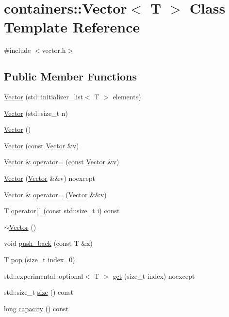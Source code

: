\hypertarget{classcontainers_1_1_vector}{}\section{containers\+:\+:Vector$<$ T $>$ Class Template Reference}
\label{classcontainers_1_1_vector}


{\ttfamily \#include $<$vector.\+h$>$}

\subsection*{Public Member Functions}
\begin{DoxyCompactItemize}
\item 
\hyperlink{classcontainers_1_1_vector_aa52463e44a833734438f930bd042950d}{Vector} (std\+::initializer\+\_\+list$<$ T $>$ elements)
\item 
\hyperlink{classcontainers_1_1_vector_a7100579cb97bfd12a22563ecba4790c3}{Vector} (std\+::size\+\_\+t n)
\item 
\hyperlink{classcontainers_1_1_vector_aeb1cf60022c7fc50ae6b17b2cba845ea}{Vector} ()
\item 
\hyperlink{classcontainers_1_1_vector_a53ca201d23d5093f1f0a5680bf878a61}{Vector} (const \hyperlink{classcontainers_1_1_vector}{Vector} \&v)
\item 
\hyperlink{classcontainers_1_1_vector}{Vector} \& \hyperlink{classcontainers_1_1_vector_a631c15e8044b459fdf35a9f0acd0d5b0}{operator=} (const \hyperlink{classcontainers_1_1_vector}{Vector} \&v)
\item 
\hyperlink{classcontainers_1_1_vector_a2c7dfd50610c1fc054516f18ec8a9452}{Vector} (\hyperlink{classcontainers_1_1_vector}{Vector} \&\&v) noexcept
\item 
\hyperlink{classcontainers_1_1_vector}{Vector} \& \hyperlink{classcontainers_1_1_vector_aade29fc98f40e726bc1c624d0157e397}{operator=} (\hyperlink{classcontainers_1_1_vector}{Vector} \&\&v)
\item 
T \hyperlink{classcontainers_1_1_vector_a8dcbd38c932f114a8237785f8272712f}{operator\mbox{[}$\,$\mbox{]}} (const std\+::size\+\_\+t i) const
\item 
\hyperlink{classcontainers_1_1_vector_aa34389ddf377eea569195c234feaef93}{$\sim$\+Vector} ()
\item 
void \hyperlink{classcontainers_1_1_vector_ae9ecdc8f09edd4d689b4cb90a05de712}{push\+\_\+back} (const T \&x)
\item 
T \hyperlink{classcontainers_1_1_vector_a35cb0393f7ba3bc682c1a58a20471a69}{pop} (size\+\_\+t index=0)
\item 
std\+::experimental\+::optional$<$ T $>$ \hyperlink{classcontainers_1_1_vector_ae744150cc6b0cd929d45e0e138fd5d29}{get} (size\+\_\+t index) noexcept
\item 
std\+::size\+\_\+t \hyperlink{classcontainers_1_1_vector_ad93daa14d3585dac313f3bd12d262ba7}{size} () const
\item 
long \hyperlink{classcontainers_1_1_vector_a11bd73e5c16f891d6828328feacea6b5}{capacity} () const
\end{DoxyCompactItemize}
